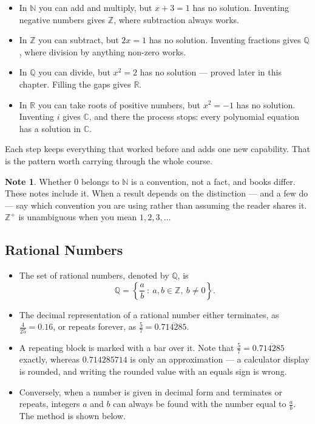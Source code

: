 \documentclass[11pt,a4paper]{article}
\theoremstyle{definition}
\newtheorem{note}[thm]{Note}
\begin{document}
\begin{itemize}
\item In $\mathbb{N}$ you can add and multiply, but $x+3=1$ has no solution.
Inventing negative numbers gives $\mathbb{Z}$, where subtraction always works.
\item In $\mathbb{Z}$ you can subtract, but $2x=1$ has no solution. Inventing
fractions gives $\mathbb{Q}$, where division by anything non-zero works.
\item In $\mathbb{Q}$ you can divide, but $x^{2}=2$ has no solution --- proved later
in this chapter. Filling the gaps gives $\mathbb{R}$.
\item In $\mathbb{R}$ you can take roots of positive numbers, but $x^{2}=-1$ has no
solution. Inventing $i$ gives $\mathbb{C}$, and there the process stops: every
polynomial equation has a solution in $\mathbb{C}$.
\end{itemize}

Each step keeps everything that worked before and adds one new capability. That
is the pattern worth carrying through the whole course.

\begin{note}
Whether $0$ belongs to $\mathbb{N}$ is a convention, not a fact, and books differ.
These notes include it. When a result depends on the distinction --- and a few do ---
say which convention you are using rather than assuming the reader shares it.
$\mathbb{Z}^{+}$ is unambiguous when you mean $1,2,3,\dots$
\end{note}




\subsection{Rational Numbers}
\begin{itemize}
\item The set of rational numbers, denoted by $\mathbb{Q}$, is
$$\mathbb{Q}=\left\{\frac{a}{b}\ :\ a,b\in\mathbb{Z},\ b\neq0\right\}.$$
\item The decimal representation of a rational number either terminates, as
$\frac{4}{25}=0.16$, or repeats forever, as $\frac{5}{7}=0.\overline{714285}$.
\item A repeating block is marked with a bar over it. Note that
$\frac{5}{7}=0.\overline{714285}$ exactly, whereas $0.714285714$ is only an
approximation --- a calculator display is rounded, and writing the rounded value
with an equals sign is wrong.
\item Conversely, when a number is given in decimal form and terminates or
repeats, integers $a$ and $b$ can always be found with the number equal to
$\frac{a}{b}$. The method is shown below.
\end{itemize}
\end{document}
